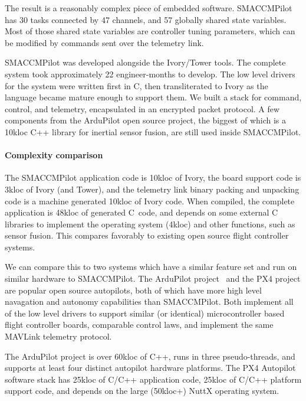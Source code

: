 The result is a reasonably complex piece of embedded software. SMACCMPilot has
30 tasks connected by 47 channels, and 57 globally shared state variables. Most
of those shared state variables are controller tuning parameters, which can be
modified by commands sent over the telemetry link.

SMACCMPilot was developed alongside the Ivory/Tower tools.  The complete system
took approximately 22 engineer-months to develop.  The low level drivers for the
system were written first in C, then transliterated to Ivory as the language
became mature enough to support them. We built a stack for command, control, and
telemetry, encapsulated in an encrypted packet protocol. A few components from
the ArduPilot open source project, the biggest of which is a 10kloc C++ library
for inertial sensor fusion, are still used inside SMACCMPilot.

\paragraph{Complexity comparison}
The SMACCMPilot application code is 10kloc of Ivory, the board support code is
3kloc of Ivory (and Tower), and the telemetry link binary packing and unpacking
code is a machine generated 10kloc of Ivory code. When compiled, the
complete application is 48kloc of generated C~code, and depends on some external
C libraries to implement the operating system (4kloc) and other functions, such
as sensor fusion.  This compares favorably to existing open source flight
controller systems.

We can compare this to two systems which have a similar feature set and run on
similar hardware to SMACCMPilot.  The ArduPilot project~\cite{apm-proj} and the
PX4 project are popular open source autopilots, both of which have more high
level navagation and autonomy capabilities than SMACCMPilot.  Both implement all
of the low level drivers to support similar (or identical) microcontroller based
flight controller boards, comparable control laws, and implement the same
MAVLink telemetry protocol.

The ArduPilot project is over 60kloc of C++, runs in three pseudo-threads, and
supports at least four distinct autopilot hardware platforms. The PX4 Autopilot
software stack has 25kloc of C/C++ application code, 25kloc of C/C++ platform
support code, and depends on the large (50kloc+) NuttX operating system.

